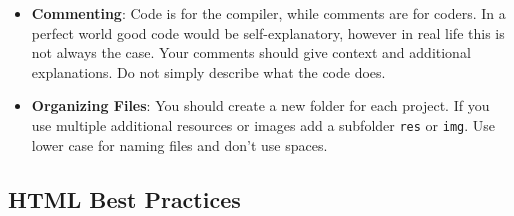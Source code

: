 \documentclass[11pt,a4paper]{report}
\newcommand{\bfb}[1]{{\bf \color{blue} #1}}
\begin{document}
\begin{itemize}
\item \bfb{Commenting}: Code is for the compiler, while comments are for coders.  In a perfect world good code would be self-explanatory, however in real life this is not always the case.  Your comments should give context and additional explanations. Do not simply describe what the code does.

\item \bfb{Organizing Files}: You should create a new folder for each project. If you use multiple additional resources or images add a subfolder \verb|res| or \verb|img|.  Use lower case for naming files and don't use spaces. 

\end{itemize}

\subsection{HTML Best Practices}
\end{document}
